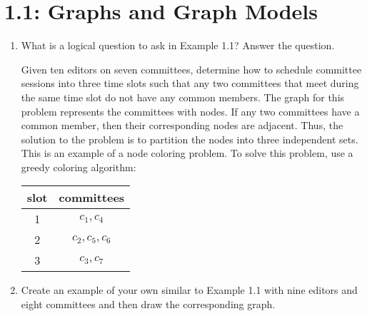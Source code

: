 \documentclass[letterpaper,12pt,fleqn]{article}
\begin{document}
\section*{1.1: Graphs and Graph Models}

\begin{enumerate}
\item What is a logical question to ask in Example 1.1?  Answer the question.

  Given ten editors on seven committees, determine how to schedule committee sessions into three time slots such
  that any two committees that meet during the same time slot do not have any common members.  The graph for this
  problem represents the committees with nodes.  If any two committees have a common member, then their
  corresponding nodes are adjacent.  Thus, the solution to the problem is to partition the nodes into three
  independent sets.  This is an example of a node coloring problem.  To solve this problem, use a greedy coloring
  algorithm:

  \begin{minipage}{3in}
  \end{minipage}
  \begin{minipage}{3in}
    \begin{tabular}{c|c}
      slot & committees \\
      \hline
      1 & \(c_1, c_4\) \\
      2 & \(c_2, c_5, c_6\) \\
      3 & \(c_3, c_7\)
    \end{tabular}
  \end{minipage}

  \bigskip

\item Create an example of your own similar to Example 1.1 with nine editors and eight committees and then draw the
  corresponding graph.


\end{enumerate}
\end{document}
